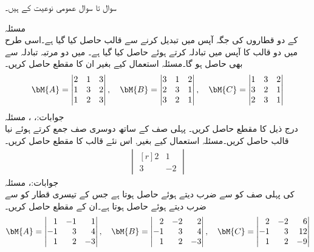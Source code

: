 
سوال  تا سوال  عمومی نوعیت کے ہیں۔

\quad مسئلہ \\
 کے دو قطاروں کی جگہ آپس میں تبدیل کرنے سے قالب  حاصل کیا گیا ہے۔اسی طرح  میں دو قالب کا آپس میں تبادلہ کرتے ہوئے  حاصل کیا گیا ہے۔ میں دو مرتبہ تبادلہ سے بھی  حاصل ہو گا۔مسئلہ  استعمال کیے بغیر ان کا مقطع حاصل کریں۔
\begin{align*}
\bM{A}=\begin{vmatrix} 2&1&3\\1&3&2\\1&2&3 \end{vmatrix},\quad \bM{B}=\begin{vmatrix} 3&1&2\\2&3&1\\3&2&1 \end{vmatrix},\quad \bM{C}=\begin{vmatrix}1&3&2\\3&2&1\\2&3&1 \end{vmatrix}
\end{align*}
جوابات:، ، 
مسئلہ \\
درج ذیل کا مقطع حاصل کریں۔ پہلی صف کے ساتھ دوسری صف جمع کرتے ہوئے نیا قالب حاصل کریں۔مسئلہ  استعمال کیے بغیر, اس نئے قالب کا مقطع  حاصل کریں۔
\begin{align*}
\begin{vmatrix*}[r]
2&1\\3&-2
\end{vmatrix*}
\end{align*}
جوابات:، 
مسئلہ \\
 کی پہلی صف کو  سے ضرب دیتے ہوئے  حاصل ہوتا ہے جس کے تیسری قطار کو  سے ضرب دیتے ہوئے  حاصل ہوتا ہے۔ان کے مقطع حاصل کریں۔
\begin{align*}
\bM{A}=\begin{vmatrix*}[r] 1&-1&1\\-1&3&4\\1&2&-3 \end{vmatrix*}, \quad \bM{B}=\begin{vmatrix*}[r] 2&-2&2\\-1&3&4\\1&2&-3 \end{vmatrix*}, \quad \bM{C}=\begin{vmatrix*}[r] 2&-2&6\\-1&3&12\\1&2&-9 \end{vmatrix*}
\end{align*}
